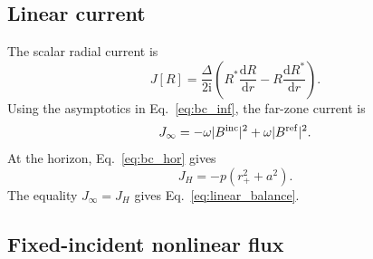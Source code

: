 \documentclass[aps,prd,twocolumn,10pt,nofootinbib,superscriptaddress,floatfix]{revtex4-2}
\newcommand{\dd}{\mathrm{d}}
\newcommand{\ii}{\mathrm{i}}
\newcommand{\rp}{r_+}
\newcommand{\Bin}{B^{\rm inc}}
\newcommand{\Bref}{B^{\rm ref}}
\newcommand{\DeltaK}{\Delta}
\begin{document}
\subsection{Linear current}

The scalar radial current is
\begin{equation}
J[R]=\frac{\DeltaK}{2\ii}
\left(R^*\frac{\dd R}{\dd r}-R\frac{\dd R^*}{\dd r}\right).
\end{equation}
Using the asymptotics in Eq.~\eqref{eq:bc_inf}, the far-zone current is
\begin{equation}
J_\infty=-\omega|\Bin|^2+\omega|\Bref|^2 .
\end{equation}
At the horizon, Eq.~\eqref{eq:bc_hor} gives
\begin{equation}
J_H=-p(\rp^2+a^2).
\end{equation}
The equality $J_\infty=J_H$ gives
Eq.~\eqref{eq:linear_balance}.

\subsection{Fixed-incident nonlinear flux}
\end{document}
